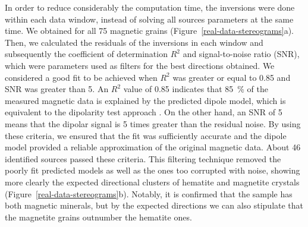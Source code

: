 \DIFdelbegin {}\DIFdelend In order to reduce considerably the computation time, the \DIFaddbegin {}\DIFaddend inversions were done within each data window, instead of solving all sources parameters at the same time. We obtained \DIFdelbegin {}\DIFdelend \DIFaddbegin {}\DIFaddend for all 75 magnetic grains (Figure~\ref{real-data-stereograms}a). Then, we calculated the residuals of the inversions in each window and subsequently the coefficient of determination $R^2$ and signal-to-noise ratio (SNR), which were parameters used as filters for the best directions obtained. We considered a good fit to be achieved when $R^2$ was greater or equal to 0.85 and SNR was greater than 5. An $R^2$ value of 0.85 indicates that \qty{85}{\percent} of the measured magnetic data is explained by the predicted dipole model, which is equivalent to the dipolarity test approach \citep{Fu2020}. On the other hand, an SNR of 5 means that the dipolar signal is 5 times greater than the residual noise. By using these criteria, we ensured that the fit was sufficiently accurate and the dipole model provided a reliable approximation of the original magnetic data. About 46 identified sources passed these criteria. This filtering technique removed the poorly fit predicted models as well as the ones too corrupted with noise, showing more clearly the expected directional clusters of hematite and magnetite crystals (Figure~\ref{real-data-stereograms}b). Notably, it is confirmed that the sample has both magnetic minerals, but by the expected directions we can also stipulate that the magnetite grains outnumber the hematite ones.

